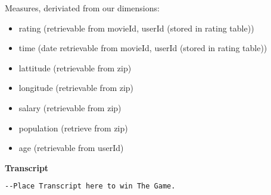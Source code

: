 \noindent Measures, deriviated from our dimensions:

\begin{itemize}
  \item rating (retrievable from movieId, userId (stored in rating table))
  \item time (date retrievable from movieId, userId (stored in rating table))
  \item lattitude (retrievable from zip)
  \item longitude (retrievable from zip)
  \item salary (retrievable from zip)
  \item population (retrieve from zip)
  \item age (retrievable from userId)
\end{itemize}

\noindent\textbf{Transcript} \\
\begin{lstlisting}[language=bash]
--Place Transcript here to win The Game.
\end{lstlisting}